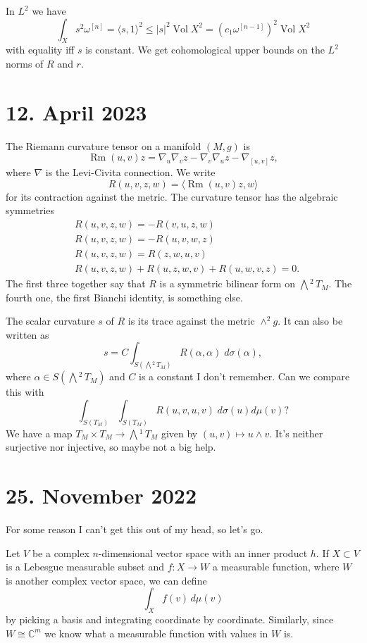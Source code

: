 \documentclass[11pt]{amsart}
\theoremstyle{definition}
\newcommand{\kk}[1]{\mathbb{#1}}
\def\^#1{^{[#1]}}
\DeclareMathOperator{\Vol}{Vol}
\DeclareMathOperator{\Rm}{Rm}
\newcommand{\ext}[1]{\bigwedge{}^{\!\!#1}\,}
\def\<{\langle}
\def\>{\rangle}
\begin{document}
In $L^2$ we have
$$
\int_X s^2 \omega\^n
= \< s, 1 \>^2 \leq |s|^2 \Vol X^2
= (c_1 \omega\^{n-1})^2 \Vol X^2
$$
with equality iff $s$ is constant.
We get cohomological upper bounds on the $L^2$ norms of $R$ and $r$.


\section{12. April 2023}

The Riemann curvature tensor on a manifold $(M,g)$ is
$$
\Rm(u,v) z = \nabla_u \nabla_v z - \nabla_v \nabla_u z - \nabla_{[u,v]} z,
$$
where $\nabla$ is the Levi-Civita connection.
We write
$$
R(u,v,z,w) = \< \Rm(u,v)z, w \>
$$
for its contraction against the metric.
The curvature tensor has the algebraic symmetries
\begin{align*}
&R(u,v,z,w) = - R(v,u,z,w)
\\
&R(u,v,z,w) = - R(u,v,w,z)
\\
&R(u,v,z,w) = R(z,w,u,v)
\\
&R(u,v,z,w) + R(u,z,w,v) + R(u,w,v,z) = 0.
\end{align*}
The first three together say that $R$ is a symmetric bilinear form on
$\ext{2}{T_M}$.
The fourth one, the first Bianchi identity, is something else.

The scalar curvature $s$ of $R$ is its trace against the metric $\wedge^2 g$.
It can also be written as
$$
s = C \int_{S(\ext{2}T_M)} R(\alpha, \alpha) \; d\sigma(\alpha),
$$
where $\alpha \in S(\ext{2}T_M)$ and $C$ is a constant I don't remember.
Can we compare this with
$$
\int_{S(T_M)} \int_{S(T_M)} R(u,v,u,v) \; d\sigma(u) d\mu(v) ?
$$
We have a map $T_M \times T_M \to \ext{1}T_M$ given by $(u,v) \mapsto u \wedge v$.
It's neither surjective nor injective, so maybe not a big help.



\section{25. November 2022}

For some reason I can't get this out of my head, so let's go.

Let $V$ be a complex $n$-dimensional vector space with an inner product $h$.
If $X \subset V$ is a Lebesgue measurable subset and $f : X \to W$ a measurable
function, where $W$ is another complex vector space, we can define
$$
\int_X f(v) \, d\mu(v)
$$
by picking a basis and integrating coordinate by coordinate.
Similarly, since $W \cong \kk C^m$ we know what a measurable function with
values in $W$ is.
\end{document}
